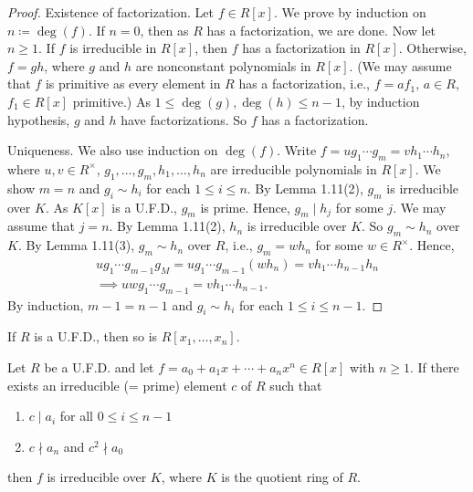 \documentclass[twoside]{article}
\theoremstyle{remark}
\begin{document}
\begin{proof}
  Existence of factorization. Let \(f \in R[x]\). We prove by induction on \(n \coloneq \deg(f)\). If \(n=0\), then as \(R\) has a factorization, we are done. Now let \(n \geq 1\). If \(f\) is irreducible in \(R[x]\), then \(f\) has a factorization in \(R[x]\). Otherwise, \(f = gh\), where \(g\) and \(h\) are nonconstant polynomials in \(R[x]\). (We may assume that \(f\) is primitive as every element in \(R\) has a factorization, i.e., \(f = af_1\), \(a \in R\), \(f_1 \in R[x]\) primitive.) As \(1 \leq \deg(g), \deg(h) \leq n-1\), by induction hypothesis, \(g\) and \(h\) have factorizations. So \(f\) has a factorization.
  
  Uniqueness. We also use induction on \(\deg(f)\). Write \(f = u g_1 \cdots g_m = v h_1 \cdots h_n\), where \(u,v \in R^\times\), \(g_1, \dots, g_m, h_1, \dots, h_n\) are irreducible polynomials in \(R[x]\). We show \(m=n\) and \(g_i \sim h_i\) for each \(1 \leq i \leq n\). By Lemma 1.11(2), \(g_m\) is irreducible over \(K\). As \(K[x]\) is a U.F.D., \(g_m\) is prime. Hence, \(g_m \mid h_j\) for some \(j\). We may assume that \(j = n\). By Lemma 1.11(2), \(h_n\) is irreducible over \(K\). So \(g_m \sim h_n\) over \(K\). By Lemma 1.11(3), \(g_m \sim h_n\) over \(R\), i.e., \(g_m = wh_n\) for some \(w \in R^\times\). Hence,
  \begin{gather*}
    u g_1 \cdots g_{m-1} g_M = u g_1 \cdots g_{m-1} (wh_n) = vh_1 \cdots h_{n-1} h_n \\
    \implies uw g_1 \cdots g_{m-1} = v h_1 \cdots h_{n-1}.
  \end{gather*}
  By induction, \(m-1 = n-1\) and \(g_i \sim h_i\) for each \(1 \leq i \leq n-1\).
\end{proof}

\begin{corollary}
  If \(R\) is a U.F.D., then so is \(R[x_1, \dots, x_n]\).
\end{corollary}

\begin{proposition}
  Let \(R\) be a U.F.D. and let \(f = a_0 + a_1 x + \cdots + a_n x^n \in R[x]\) with \(n \geq 1\). If there exists an irreducible (= prime) element \(c\) of \(R\) such that
  \begin{enumerate}[label=\textup{(\roman*)}, nosep]
    \item \(c \mid a_i\) for all \(0 \leq i \leq n-1\)
    \item \(c \nmid a_n\) and \(c^2 \nmid a_0\)
  \end{enumerate}
  then \(f\) is irreducible over \(K\), where \(K\) is the quotient ring of \(R\).
\end{proposition}
\end{document}
